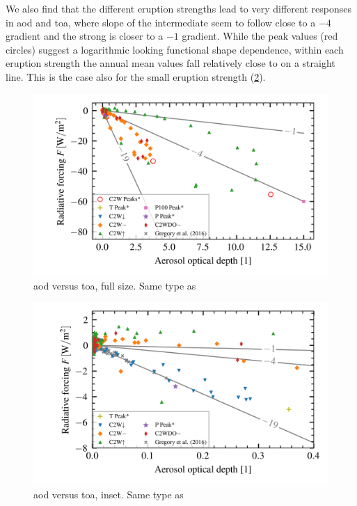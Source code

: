 \documentclass[twocol]{ametsocV5}
\begin{document}

We also find that the different eruption strengths lead to very different responses in
\acrshort{aod} and \acrshort{toa}, where slope of the intermediate seem to follow close
to a \( -4 \) gradient and the strong is closer to a \( -1 \) gradient. While the peak
values (red circles) suggest a logarithmic looking functional shape dependence, within
each eruption strength the annual mean values fall relatively close to on a straight
line. This is the case also for the small eruption strength
(\cref{fig:aod_vs_toa_inset}).

\begin{figure}
  \begin{center}
    \includegraphics[width=0.95\linewidth]{figures/aod_vs_toa_avg_full.png}
  \end{center}
  \caption{\acrshort{aod} versus \acrshort{toa}, full size. Same type as
    \citet{gregory2016}}%
  \label{fig:aod_vs_toa_full}
\end{figure}

\begin{figure}
  \begin{center}
    \includegraphics[width=0.95\linewidth]{figures/aod_vs_toa_avg_inset.png}
  \end{center}
  \caption{\acrshort{aod} versus \acrshort{toa}, inset. Same type as
    \citet{gregory2016}}%
  \label{fig:aod_vs_toa_inset}
\end{figure}
\end{document}
